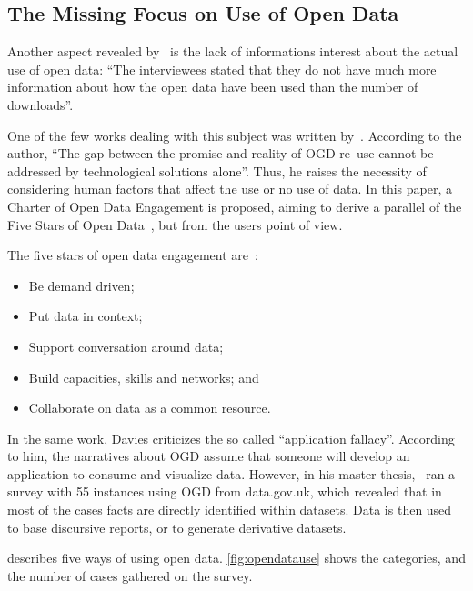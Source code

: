 \subsection{The Missing Focus on Use of Open Data}

Another aspect revealed by~ is the lack of informations interest about the actual use of open data: ``The interviewees stated that they do not have much more information about how the open data have been used than the number of downloads''.

One of the few works dealing with this subject was written by~. According to the author, ``The gap between the promise and reality of OGD re--use cannot be addressed by technological solutions alone''.
Thus, he raises the necessity of considering human factors that affect the use or no use of data.
In this paper, a Charter of Open Data Engagement is proposed, aiming to derive a parallel of the Five Stars of Open Data~\cite{Berners-Lee2010}, but from the users point of view.

The five stars of open data engagement are~\cite{Davies2012}:

\begin{itemize}
	\item Be demand driven;
	\item Put data in context;
	\item Support conversation around data;
	\item Build capacities, skills and networks; and
	\item Collaborate on data as a common resource.
\end{itemize}

In the same work, Davies criticizes the so called ``application fallacy''.
According to him, the narratives about OGD assume that someone will develop an application to consume and visualize data.
However, in his master thesis,~ ran a survey with 55 instances using OGD from data.gov.uk, which revealed that in most of the cases facts are directly identified within datasets.
Data is then used to base discursive reports, or to generate derivative datasets.

 describes five ways of using open data. 
\autoref{fig:opendatause} shows the categories, and the number of cases gathered on the survey.

